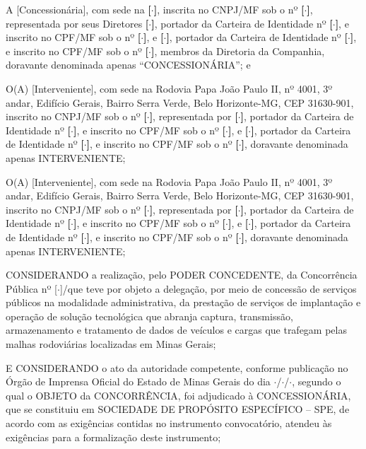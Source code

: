\documentclass[a4paper,11pt]{report} %
\newcommand{\NumeroLicitacao}{[$\cdot$]}
\newcommand{\AnoLicitacao}{\the\year}
\newcommand{\DataHomologacao}{$\cdot$/$\cdot$/$\cdot$}
\newcommand{\ContratanteEndereco}{Rodovia Papa João Paulo II, nº 4001, 3º andar, Edifício Gerais, Bairro Serra Verde, Belo Horizonte-MG, CEP 31630-901}
\newcommand{\Contratada}{[Concessionária]}
\newcommand{\ContratadaEndereco}{\textbf{[$\cdot$]}}
\newcommand{\ContratadaCNPJ}{\textbf{[$\cdot$]}}
\newcommand{\RepresentanteContratadaNomeA}{\textbf{[$\cdot$]}} %
\newcommand{\RepresentanteContratadaCPFA}{\textbf{[$\cdot$]}}
\newcommand{\RepresentanteContratadaCIA}{\textbf{[$\cdot$]}}
\newcommand{\RepresentanteContratadaNomeB}{\textbf{[$\cdot$]}} %
\newcommand{\RepresentanteContratadaCPFB}{\textbf{[$\cdot$]}}
\newcommand{\RepresentanteContratadaCIB}{\textbf{[$\cdot$]}}
\newcommand{\IntervenienteANome}{[Interveniente]}
\newcommand{\IntervenienteAEndereco}{\ContratanteEndereco}
\newcommand{\IntervenienteACNPJ}{\textbf{[$\cdot$]}}
\newcommand{\RepresentanteAIntervenienteA}{\textbf{[$\cdot$]}} %
\newcommand{\RepresentanteAIntervenienteACI}{\textbf{[$\cdot$]}}
\newcommand{\RepresentanteAIntervenienteACPF}{\textbf{[$\cdot$]}}
\newcommand{\RepresentanteBIntervenienteACI}{\textbf{[$\cdot$]}}
\newcommand{\RepresentanteBIntervenienteACPF}{\textbf{[$\cdot$]}}
\newcommand{\IntervenienteBNome}{[Interveniente]}
\newcommand{\IntervenienteBEndereco}{\ContratanteEndereco}
\newcommand{\IntervenienteBCNPJ}{\textbf{[$\cdot$]}}
\newcommand{\RepresentanteAIntervenienteB}{\textbf{[$\cdot$]}} %
\newcommand{\RepresentanteAIntervenienteBCI}{\textbf{[$\cdot$]}}
\newcommand{\RepresentanteAIntervenienteBCPF}{\textbf{[$\cdot$]}}
\newcommand{\RepresentanteBIntervenienteBCI}{\textbf{[$\cdot$]}}
\newcommand{\RepresentanteBIntervenienteBCPF}{\textbf{[$\cdot$]}}
\begin{document}
A \Contratada, com sede na \ContratadaEndereco, inscrita no CNPJ/MF sob o nº \ContratadaCNPJ, representada por seus Diretores \RepresentanteContratadaNomeA, portador da Carteira de Identidade nº \RepresentanteContratadaCIA, e inscrito no CPF/MF sob o nº \RepresentanteContratadaCPFA, e \RepresentanteContratadaNomeB, portador da Carteira de Identidade nº \RepresentanteContratadaCIB, e inscrito no CPF/MF sob o nº \RepresentanteContratadaCPFB, membros da Diretoria da Companhia, doravante denominada apenas “CONCESSIONÁRIA”; e

O(A) \IntervenienteANome, com sede na \IntervenienteAEndereco, inscrito no CNPJ/MF sob o nº \IntervenienteACNPJ, representada por \RepresentanteAIntervenienteA, portador da Carteira de Identidade nº \RepresentanteAIntervenienteACI, e inscrito no CPF/MF sob o nº \RepresentanteAIntervenienteACPF, e \RepresentanteBIntervenienteACPF, portador da Carteira de Identidade nº \RepresentanteBIntervenienteACI, e inscrito no CPF/MF sob o nº \RepresentanteBIntervenienteACPF, doravante denominada apenas INTERVENIENTE;

O(A) \IntervenienteBNome, com sede na \IntervenienteBEndereco, inscrito no CNPJ/MF sob o nº \IntervenienteBCNPJ, representada por \RepresentanteAIntervenienteB, portador da Carteira de Identidade nº \RepresentanteAIntervenienteBCI, e inscrito no CPF/MF sob o nº \RepresentanteAIntervenienteBCPF, e \RepresentanteBIntervenienteBCPF, portador da Carteira de Identidade nº \RepresentanteBIntervenienteBCI, e inscrito no CPF/MF sob o nº \RepresentanteBIntervenienteBCPF, doravante denominada apenas INTERVENIENTE;

CONSIDERANDO a realização, pelo PODER CONCEDENTE, da Concorrência Pública nº \NumeroLicitacao/\AnoLicitacao que teve por objeto a delegação, por meio de concessão de serviços públicos na modalidade administrativa, da prestação de serviços de implantação e operação de solução tecnológica que abranja captura, transmissão, armazenamento e tratamento de dados de veículos e cargas que trafegam pelas malhas rodoviárias localizadas em Minas Gerais;

E CONSIDERANDO o ato da autoridade competente, conforme publicação no Órgão de Imprensa Oficial do Estado de Minas Gerais do dia \DataHomologacao, segundo o qual o OBJETO da CONCORRÊNCIA, foi adjudicado à CONCESSIONÁRIA, que se constituiu em SOCIEDADE DE PROPÓSITO ESPECÍFICO – SPE, de acordo com as exigências contidas no instrumento convocatório, atendeu às exigências para a formalização deste instrumento;
\end{document}
